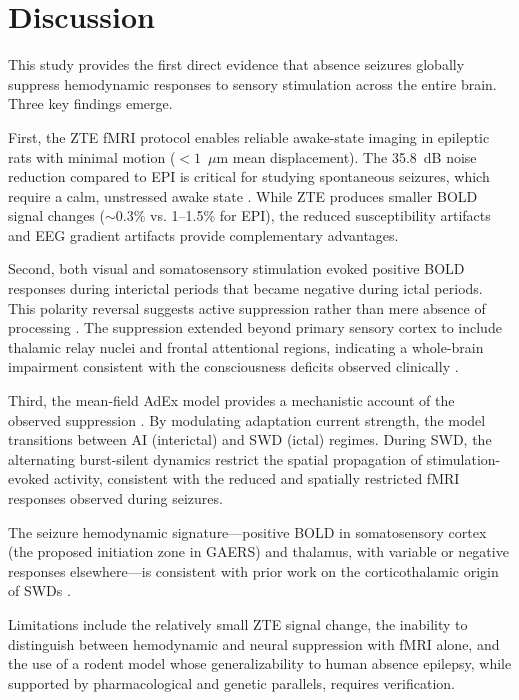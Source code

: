 \documentclass[11pt]{article}
\begin{document}
\section{Discussion}

This study provides the first direct evidence that absence seizures globally suppress hemodynamic responses to sensory stimulation across the entire brain. Three key findings emerge.

First, the ZTE fMRI protocol enables reliable awake-state imaging in epileptic rats with minimal motion ($<1$~$\mu$m mean displacement). The 35.8~dB noise reduction compared to EPI is critical for studying spontaneous seizures, which require a calm, unstressed awake state \citep{depaulis2015gaers}. While ZTE produces smaller BOLD signal changes ($\sim$0.3\% vs. 1--1.5\% for EPI), the reduced susceptibility artifacts and EEG gradient artifacts provide complementary advantages.

Second, both visual and somatosensory stimulation evoked positive BOLD responses during interictal periods that became negative during ictal periods. This polarity reversal suggests active suppression rather than mere absence of processing \citep{blumenfeld2005consciousness}. The suppression extended beyond primary sensory cortex to include thalamic relay nuclei and frontal attentional regions, indicating a whole-brain impairment consistent with the consciousness deficits observed clinically \citep{crunelli2020childhood}.

Third, the mean-field AdEx model provides a mechanistic account of the observed suppression \citep{brette2005adaptive, destexhe2003neuronal}. By modulating adaptation current strength, the model transitions between AI (interictal) and SWD (ictal) regimes. During SWD, the alternating burst-silent dynamics restrict the spatial propagation of stimulation-evoked activity, consistent with the reduced and spatially restricted fMRI responses observed during seizures.

The seizure hemodynamic signature---positive BOLD in somatosensory cortex (the proposed initiation zone in GAERS) and thalamus, with variable or negative responses elsewhere---is consistent with prior work on the corticothalamic origin of SWDs \citep{meeren2002cortical, polack2007deep}.

Limitations include the relatively small ZTE signal change, the inability to distinguish between hemodynamic and neural suppression with fMRI alone, and the use of a rodent model whose generalizability to human absence epilepsy, while supported by pharmacological and genetic parallels, requires verification.
\end{document}
